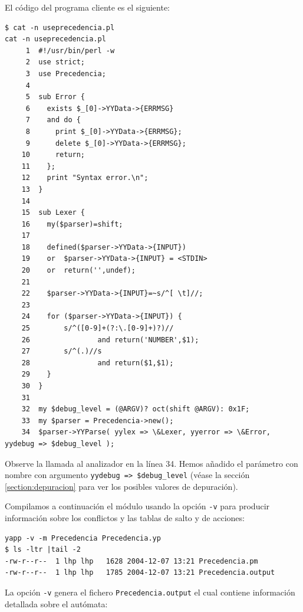El código del programa cliente es el siguiente:

\begin{verbatim}
$ cat -n useprecedencia.pl
cat -n useprecedencia.pl
     1  #!/usr/bin/perl -w
     2  use strict;
     3  use Precedencia;
     4
     5  sub Error {
     6    exists $_[0]->YYData->{ERRMSG}
     7    and do {
     8      print $_[0]->YYData->{ERRMSG};
     9      delete $_[0]->YYData->{ERRMSG};
    10      return;
    11    };
    12    print "Syntax error.\n";
    13  }
    14
    15  sub Lexer {
    16    my($parser)=shift;
    17
    18    defined($parser->YYData->{INPUT})
    19    or  $parser->YYData->{INPUT} = <STDIN>
    20    or  return('',undef);
    21
    22    $parser->YYData->{INPUT}=~s/^[ \t]//;
    23
    24    for ($parser->YYData->{INPUT}) {
    25        s/^([0-9]+(?:\.[0-9]+)?)//
    26                and return('NUMBER',$1);
    27        s/^(.)//s
    28                and return($1,$1);
    29    }
    30  }
    31
    32  my $debug_level = (@ARGV)? oct(shift @ARGV): 0x1F;
    33  my $parser = Precedencia->new();
    34  $parser->YYParse( yylex => \&Lexer, yyerror => \&Error, yydebug => $debug_level );
\end{verbatim}

Observe la llamada al analizador en la línea 34. Hemos 
añadido el parámetro con nombre  
con argumento \verb|yydebug => $debug_level| (véase la
sección \ref{section:depuracion} para ver los posibles
valores de depuración).

Compilamos a continuación el módulo usando la opción \verb|-v| para
producir información sobre los conflictos y las tablas de salto y 
de acciones:
\begin{verbatim}
yapp -v -m Precedencia Precedencia.yp
$ ls -ltr |tail -2
-rw-r--r--  1 lhp lhp   1628 2004-12-07 13:21 Precedencia.pm
-rw-r--r--  1 lhp lhp   1785 2004-12-07 13:21 Precedencia.output
\end{verbatim}

La opción \verb|-v| genera el fichero \verb|Precedencia.output|
el cual contiene información detallada sobre el autómata:

